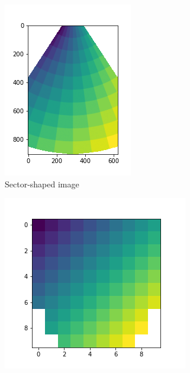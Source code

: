 \documentclass[11pt]{article} %
\begin{document}
	\begin{figure}
	\centering
		\begin{subfigure}{0.29\textwidth}
		\includegraphics[width=\textwidth]{figuras/polar_original.png}
		\caption{Sector-shaped image}
		\end{subfigure}
		\begin{subfigure}{0.35\textwidth}
		\includegraphics[width=\textwidth]{figuras/polar_new.png}

\end{subfigure}
\end{figure}
\end{document}
